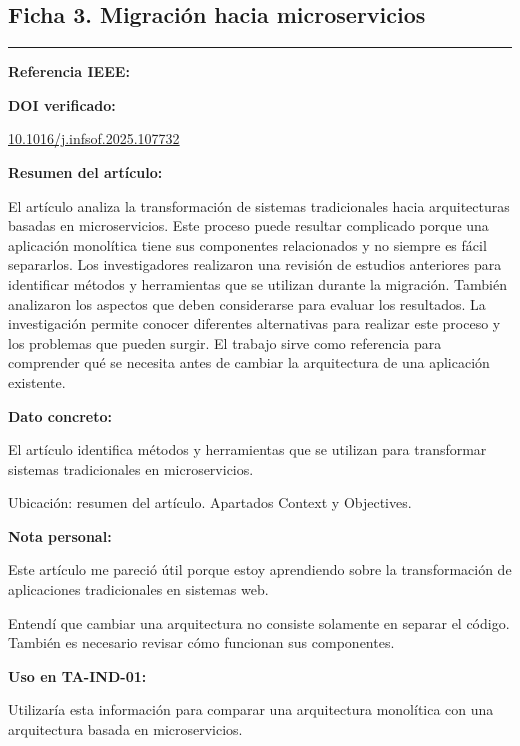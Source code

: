 \documentclass[12pt,a4paper]{article}
\newcommand{\ficha}[7]{

\subsection*{#1}

\noindent
{\color{azul}\rule{\linewidth}{0.8pt}}

\textbf{Referencia IEEE:}

\fullcite{#2}

\textbf{DOI verificado:}

\href{https://doi.org/#3}{#3}

\textbf{Resumen del artículo:}

#4

\textbf{Dato concreto:}

#5

\textbf{Nota personal:}

#6

\textbf{Uso en TA-IND-01:}

#7

\vspace{6mm}
}
\begin{document}

\ficha
{Ficha 3. Migración hacia microservicios}
{mohottige2025}
{10.1016/j.infsof.2025.107732}
{
El artículo analiza la
transformación de sistemas
tradicionales hacia arquitecturas
basadas en microservicios.
Este proceso puede resultar
complicado porque una aplicación
monolítica tiene sus componentes
relacionados y no siempre
es fácil separarlos.
Los investigadores realizaron
una revisión de estudios
anteriores para identificar
métodos y herramientas que
se utilizan durante la migración.
También analizaron los aspectos
que deben considerarse para
evaluar los resultados.
La investigación permite conocer
diferentes alternativas para
realizar este proceso y los
problemas que pueden surgir.
El trabajo sirve como referencia
para comprender qué se necesita
antes de cambiar la arquitectura
de una aplicación existente.
}
{
El artículo identifica métodos
y herramientas que se utilizan
para transformar sistemas
tradicionales en microservicios.

Ubicación: resumen del artículo.
Apartados Context y Objectives.
}
{
Este artículo me pareció útil
porque estoy aprendiendo sobre
la transformación de aplicaciones
tradicionales en sistemas web.

Entendí que cambiar una arquitectura
no consiste solamente en separar
el código. También es necesario
revisar cómo funcionan
sus componentes.
}
{
Utilizaría esta información
para comparar una arquitectura
monolítica con una arquitectura
basada en microservicios.
}

\end{document}
